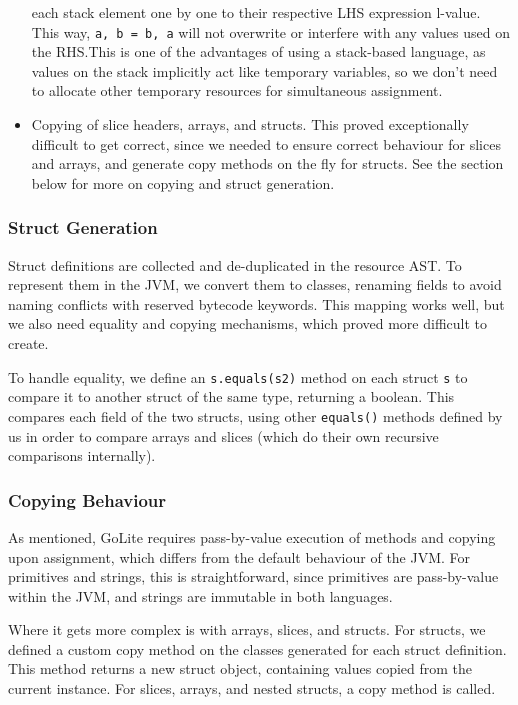 \documentclass[11pt]{article}
\begin{document}
\begin{itemize}
  each stack element one by one to their respective LHS expression
  l-value. This way, \texttt{a, b = b, a} will not overwrite or
  interfere with any values used on the RHS.\@ This is one of the
  advantages of using a stack-based language, as values on the stack
  implicitly act like temporary variables, so we don't need to
  allocate other temporary resources for simultaneous assignment.
\item Copying of slice headers, arrays, and structs. This proved
  exceptionally difficult to get correct, since we needed to ensure
  correct behaviour for slices and arrays, and generate copy methods
  on the fly for structs. See the section below for more on copying
  and struct generation.
\end{itemize}

\subsubsection{Struct Generation}

Struct definitions are collected and de-duplicated in the resource
AST.  To represent them in the JVM, we convert them to classes,
renaming fields to avoid naming conflicts with reserved bytecode
keywords. This mapping works well, but we also need equality and
copying mechanisms, which proved more difficult to create.

To handle equality, we define an \texttt{s.equals(s2)} method on each
struct \texttt{s} to compare it to another struct of the same type,
returning a boolean.  This compares each field of the two structs,
using other \texttt{equals()} methods defined by us in order to
compare arrays and slices (which do their own recursive comparisons
internally).

\subsubsection{Copying Behaviour}

As mentioned, GoLite requires pass-by-value execution of methods and
copying upon assignment, which differs from the default behaviour of
the JVM. For primitives and strings, this is straightforward, since
primitives are pass-by-value within the JVM, and strings are immutable
in both languages.

Where it gets more complex is with arrays, slices, and structs. For
structs, we defined a custom copy method on the classes generated for
each struct definition. This method returns a new struct object,
containing values copied from the current instance. For slices,
arrays, and nested structs, a copy method is called.
\end{document}
